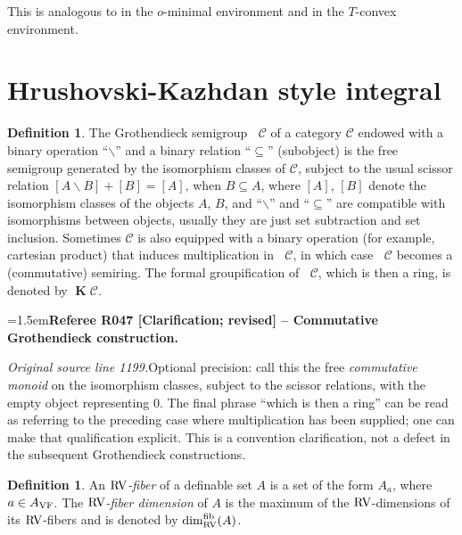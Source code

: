 \documentclass[12pt]{amsart}
\newcommand{\RefereeRemark}[4]{%
  \par\medskip\begingroup\normalfont\small\color{RefereePurple}%
  \emergencystretch=1.5em\noindent\textbf{Referee R#1 [#2] -- #3.}\par\nobreak\noindent #4\par
  \endgroup\medskip
}
\newcommand{\memph}[1]{{\color{magenta}\emph{#1}}}
\theoremstyle{plain}
\theoremstyle{definition}
\newtheorem{defn}[thm]{Definition}
\theoremstyle{remark}
\numberwithin{equation}{section}
\theoremstyle{plain}
\newcommand{\VF}{\textup{VF}}
\newcommand{\RV}{\textup{RV}}
\newcommand{\omin}{$o$\nobreakdash}
\newcommand{\T}{$T$\nobreakdash}
\newcommand{\0}{\emptyset}
\newcommand{\mdl}[1]{\mathcal{#1}}  %
\newcommand{\mi}{\smallsetminus}
\DeclareMathOperator{\gsk}{\mathbf{K}_+}
\DeclareMathOperator{\ggk}{\mathbf{K}}
\DeclareMathOperator{\fib}{fib}
\begin{document}
This is analogous to \cite[Corollary~6.2.4]{dries:1998} in the \omin-minimal environment and \cite[Lemma~2.38]{Yin:tcon:1.5} in the \T-convex environment.


\section{Hrushovski-Kazhdan style integral}\label{sec:HK:main}

\begin{defn}
\label{def:Kgroup}
The Grothendieck semigroup $\gsk \mdl C$ of a category $\mdl C$ endowed with a binary operation ``$\mi$'' and a binary relation ``$\subseteq$'' (subobject) is the free semigroup generated by the isomorphism classes of $\mdl C$, subject to the usual scissor relation
$[A \mi B] + [B] = [A]$, when $B\subseteq A$,
where $[A]$, $[B]$ denote the isomorphism classes of the objects $A$, $B$, and ``$\mi$'' and ``$\subseteq$'' are compatible with isomorphisms between objects, usually they are just set subtraction and set inclusion. Sometimes $\mdl C$ is also equipped with a binary operation (for example, cartesian product) that induces multiplication in $\gsk \mdl C$, in which case $\gsk \mdl C$ becomes a (commutative) semiring. The formal groupification of  $\gsk \mdl C$, which is then a ring, is denoted by $\ggk \mdl C$. %

\RefereeRemark{047}{Clarification; revised}{Commutative Grothendieck construction}{%
\textit{Original source line 1199.}\quad Optional precision: call this the free \emph{commutative monoid} on the isomorphism classes, subject to the scissor relations, with the empty object representing $0$. The final phrase ``which is then a ring'' can be read as referring to the preceding case where multiplication has been supplied; one can make that qualification explicit. This is a convention clarification, not a defect in the subsequent Grothendieck constructions.
}
\end{defn}

\begin{defn}
An \memph{$\RV$-fiber} of a definable set $A$ is a set of the form $A_a$, where $a \in A_{\VF}$. The \memph{$\RV$-fiber dimension} of $A$ is the maximum of the $\RV$-dimensions of its $\RV$-fibers and is denoted by $\dim^{\fib}_{\RV}(A)$.
\end{defn}
\end{document}
